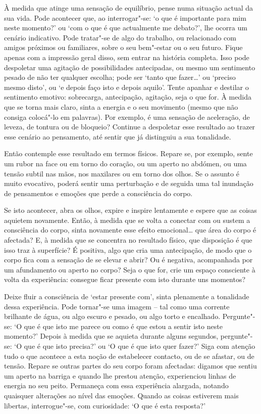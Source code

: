 À medida que atinge uma sensação de equilíbrio, pense numa situação actual da sua vida. Pode acontecer que, ao interrogar"-se: `o que é importante para mim neste momento?' ou `com o que é que actualmente me debato?', lhe ocorra um cenário indicativo. Pode tratar"-se de algo do trabalho, ou relacionado com amigos próximos ou familiares, sobre o seu bem"-estar ou o seu futuro. Fique apenas com a impressão geral disso, sem entrar na história completa. Isso pode despoletar uma agitação de possibilidades antecipadas, ou mesmo um sentimento pesado de não ter qualquer escolha; pode ser `tanto que fazer\ldots{}' ou `preciso mesmo disto', ou `e depois faço isto e depois aquilo'. Tente apanhar e destilar o sentimento emotivo: sobrecarga, antecipação, agitação, seja o que for. À medida que se torna mais claro, sinta a energia e o seu movimento (mesmo que não consiga colocá"-lo em palavras). Por exemplo, é uma sensação de aceleração, de leveza, de tontura ou de bloqueio? Continue a despoletar esse resultado ao trazer esse cenário ao pensamento, até sentir que já distinguiu a sua tonalidade.

Então contemple esse resultado em termos físicos. Repare se, por exemplo, sente um rubor na face ou em torno do coração, ou um aperto no abdómen, ou uma tensão subtil nas mãos, nos maxilares ou em torno dos olhos. Se o assunto é muito evocativo, poderá sentir uma perturbação e de seguida uma tal inundação de pensamentos e emoções que perde a consciência do corpo.

Se isto acontecer, abra os olhos, expire e inspire lentamente e espere que as coisas aquietem novamente. Então, à medida que se volta a conectar com ou sustem a consciência do corpo, sinta novamente esse efeito emocional\ldots{} que área do corpo é afectada? E, à medida que se concentra no resultado físico, que disposição é que isso traz à superfície? É positiva, algo que cria uma antecipação, de modo que o corpo fica com a sensação de se elevar e abrir? Ou é negativa, acompanhada por um afundamento ou aperto no corpo? Seja o que for, crie um espaço consciente à volta da experiência: consegue ficar presente com isto durante uns momentos?

Deixe fluir a consciência de `estar presente com', sinta plenamente a tonalidade dessa experiência. Pode tornar"-se uma imagem -- tal como uma corrente brilhante de água, ou algo escuro e pesado, ou algo torto e encalhado. Pergunte"-se: `O que é que isto me parece ou como é que estou a sentir isto neste momento?' Depois à medida que se aquieta durante alguns segundos, pergunte"-se: `O que é que isto precisa?' ou `O que é que isto quer fazer?' Siga com atenção tudo o que acontece a esta noção de estabelecer contacto, ou de se afastar, ou de tensão. Repare se outras partes do seu corpo foram afectadas: digamos que sentiu um aperto na barriga e quando lhe prestou atenção, experienciou linhas de energia no seu peito. Permaneça com essa experiência alargada, notando quaisquer alterações ao nível das emoções. Quando as coisas estiverem mais libertas, interrogue"-se, com curiosidade: `O que é esta resposta?'

